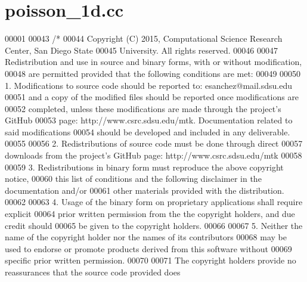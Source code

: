 \hypertarget{poisson__1d_8cc_source}{\section{poisson\+\_\+1d.\+cc}
\label{poisson__1d_8cc_source}
}

\begin{DoxyCode}
00001 
00043 \textcolor{comment}{/*}
00044 \textcolor{comment}{Copyright (C) 2015, Computational Science Research Center, San Diego State}
00045 \textcolor{comment}{University. All rights reserved.}
00046 \textcolor{comment}{}
00047 \textcolor{comment}{Redistribution and use in source and binary forms, with or without modification,}
00048 \textcolor{comment}{are permitted provided that the following conditions are met:}
00049 \textcolor{comment}{}
00050 \textcolor{comment}{1. Modifications to source code should be reported to: esanchez@mail.sdsu.edu}
00051 \textcolor{comment}{and a copy of the modified files should be reported once modifications are}
00052 \textcolor{comment}{completed, unless these modifications are made through the project's GitHub}
00053 \textcolor{comment}{page: http://www.csrc.sdsu.edu/mtk. Documentation related to said modifications}
00054 \textcolor{comment}{should be developed and included in any deliverable.}
00055 \textcolor{comment}{}
00056 \textcolor{comment}{2. Redistributions of source code must be done through direct}
00057 \textcolor{comment}{downloads from the project's GitHub page: http://www.csrc.sdsu.edu/mtk}
00058 \textcolor{comment}{}
00059 \textcolor{comment}{3. Redistributions in binary form must reproduce the above copyright notice,}
00060 \textcolor{comment}{this list of conditions and the following disclaimer in the documentation and/or}
00061 \textcolor{comment}{other materials provided with the distribution.}
00062 \textcolor{comment}{}
00063 \textcolor{comment}{4. Usage of the binary form on proprietary applications shall require explicit}
00064 \textcolor{comment}{prior written permission from the the copyright holders, and due credit should}
00065 \textcolor{comment}{be given to the copyright holders.}
00066 \textcolor{comment}{}
00067 \textcolor{comment}{5. Neither the name of the copyright holder nor the names of its contributors}
00068 \textcolor{comment}{may be used to endorse or promote products derived from this software without}
00069 \textcolor{comment}{specific prior written permission.}
00070 \textcolor{comment}{}
00071 \textcolor{comment}{The copyright holders provide no reassurances that the source code provided does}

\end{DoxyCode}
